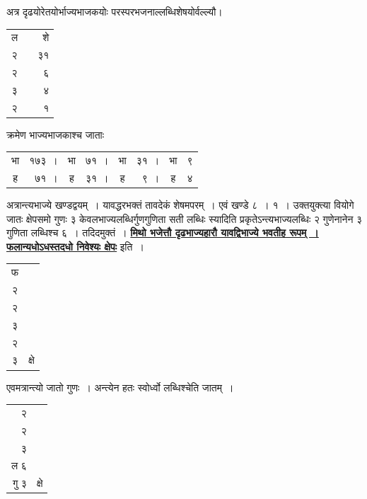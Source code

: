 \documentclass[11pt, openany]{book}
\begin{document}
{{\noindent अत्र दृढयोरेतयोर्भाज्यभाजकयोः परस्परभजनाल्लब्धिशेषयोर्वल्ल्यौ।

\vspace{-2mm}
\begin{table}[h!]
    \centering\s
    \begin{tabular}{ccr}
       ल & &शे\\
२& &३१\\
२& &६\\
३& &४\\
२& &१
    \end{tabular}
\end{table}
\vspace{-2mm}

\noindent क्रमेण भाज्यभाजकाश्च जाताः

\vspace{-2mm}
\begin{table}[h!]
    \centering\s
    \begin{tabular}{crcrcrcr}
        भा &१७३~।& भा &७१~।& भा &३१~।& भा &९\\
 ह &७१~।& ह& ३१~।& ह& ९~।& ह& ४
    \end{tabular}
\end{table}
\newpage
\noindent अत्रान्त्यभाज्ये खण्डद्वयम्~। यावद्धरभक्तं तावदेकं शेषमपरम्~। एवं खण्डे
८~। १~। उक्तयुक्त्या वियोगे जातः क्षेपसमो गुणः ३ केवलभाज्यलब्धिर्गुणगुणिता सती
लब्धिः स्यादिति प्रकृतेऽन्त्यभाज्यलब्धिः २ गुणेनानेन ३ गुणिता लब्धिश्च ६~।
तदिदमुक्तं~। 
\hyperref[51]{\textbf{मिथो भजेत्तौ दृढभाज्यहारौ यावद्विभाज्ये भवतीह रूपम्~। फलान्यधोऽधस्तदधो
निवेश्यः क्षेपः}} इति~। 

\vspace{-2mm}
\begin{table}[h!]
    \centering\s
    \begin{tabular}{cc}
      फ&\\
२&\\
२&\\
३&\\
२&\\
३& क्षे\\
    \end{tabular}
\end{table}
\vspace{-2mm}

एवमत्रान्त्यो जातो गुणः~। अन्त्येन हतः स्वोर्ध्वो लब्धिश्चेति जातम्~।

\vspace{-2mm}
\begin{table}[h!]
    \centering\s
    \begin{tabular}{rl}
     २&\\
२&\\
३&\\
 ल ६ &\\
गु ३& \hspace{-4mm} क्षे
   \end{tabular}
\end{table}  
\vspace{-2mm}

}}
\end{document}
